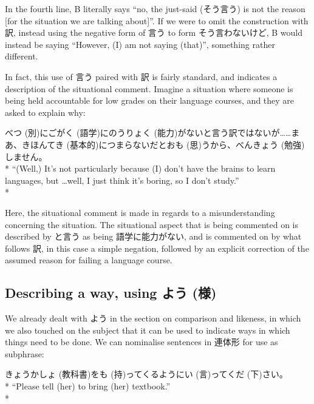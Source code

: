 \documentclass[11pt, b5paper, twoside, openright, onecolumn]{book}
\makeatletter
\newcommand*{\rubystack}[2]{{\relscale{0.5}%
  \begin{tabular}[b]{@{}c@{}}%
    {#1}\\%
   {\textscale{2}{#2}}%
  \end{tabular}}%
}
\DeclareRobustCommand*{\ruby}[2]{%
  \mbox{%
    \setlength{\parskip}{0ex}%
    \BeginAccSupp{method=pdfstringdef,ActualText={#1}}%
      \rubystack{\phantom{#2}}{#1}%
      \llap{%
        \rubystack{#2}{\phantom{#1}}%
      }%
    \EndAccSupp{}%
  }%
}
\renewcommand*{\ruby}[2]{#2 (#1)}%
\newenvironment{exampleblock}{
\setlength{\parindent}{0.6in}
\begin{minipage}[t]{\dimexpr\textwidth-\parindent}}
{\end{minipage}}
\makeatother
\begin{document}
In the fourth line‚ B literally says “no‚ the just-said (そう言う) is not the reason [for the situation we are talking about]”. If we were to omit the construction with 訳‚ instead using the negative form of 言う to form そう言わないけど‚ B would instead be saying “However‚ (I) am not saying (that)”‚ something rather different.

In fact‚ this use of 言う paired with 訳 is fairly standard‚ and indicates a description of the situational comment. Imagine a situation where someone is being held accountable for low grades on their language courses‚ and they are asked to explain why:

\vspace{0.4cm}
\begin{exampleblock}
\ruby{別}{べつ}に\ruby{語学}{ごがく}に\ruby{能力}{のうりょく}がないと言う訳ではないが……まあ、\ruby{基本的}{きほんてき}につまらないだと\ruby{思}{おも}うから、\ruby{勉強}{べんきょう}しません。 \\* 
“(Well‚) It’s not particularly because (I) don’t have the brains to learn languages‚ but …well‚ I just think it’s boring‚ so I don’t study.” \\* 
\end{exampleblock}
\vspace{0.2cm}

Here‚ the situational comment is made in regards to a misunderstanding concerning the situation. The situational aspect that is being commented on is described by と言う as being 語学に能力がない‚ and is commented on by what follows 訳‚ in this case a simple negation‚ followed by an explicit correction of the assumed reason for failing a language course.

\subsection{Describing a way‚ using \ruby{様}{よう}}

We already dealt with よう in the section on comparison and likeness‚ in which we also touched on the subject that it can be used to indicate ways in which things need to be done. We can nominalise sentences in 連体形 for use as subphrase:

\vspace{0.4cm}
\begin{exampleblock}
\ruby{教科書}{きょうかしょ}を\ruby{持}{も}ってくるように\ruby{言}{い}って\ruby{下}{くだ}さい。 \\* 
“Please tell (her) to bring (her) textbook.” \\* 
\end{exampleblock}
\vspace{0.2cm}
\end{document}
